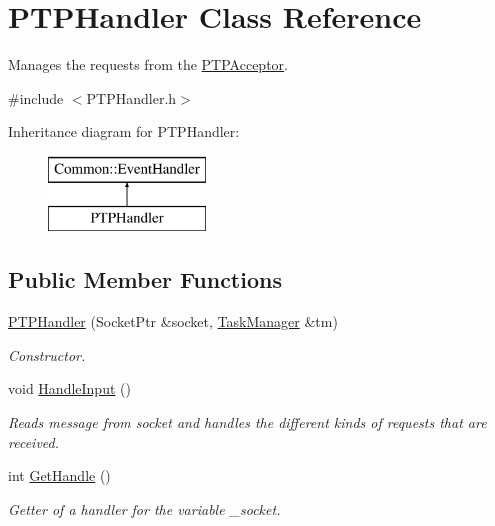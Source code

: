 \hypertarget{class_p_t_p_handler}{\section{P\-T\-P\-Handler Class Reference}
\label{class_p_t_p_handler}
}


Manages the requests from the \hyperlink{class_p_t_p_acceptor}{P\-T\-P\-Acceptor}.  




{\ttfamily \#include $<$P\-T\-P\-Handler.\-h$>$}

Inheritance diagram for P\-T\-P\-Handler\-:\begin{figure}[H]
\begin{center}
\leavevmode
\includegraphics[height=2.000000cm]{class_p_t_p_handler}
\end{center}
\end{figure}
\subsection*{Public Member Functions}
\begin{DoxyCompactItemize}
\item 
\hyperlink{class_p_t_p_handler_a8822999ece7959f308a744a8e2f9820b}{P\-T\-P\-Handler} (Socket\-Ptr \&socket, \hyperlink{class_task_manager}{Task\-Manager} \&tm)
\begin{DoxyCompactList}\small\item\em Constructor. \end{DoxyCompactList}\item 
\hypertarget{class_p_t_p_handler_a7e5a0b3cbf3a55ead9e35d5303d58288}{void \hyperlink{class_p_t_p_handler_a7e5a0b3cbf3a55ead9e35d5303d58288}{Handle\-Input} ()}\label{class_p_t_p_handler_a7e5a0b3cbf3a55ead9e35d5303d58288}

\begin{DoxyCompactList}\small\item\em Reads message from socket and handles the different kinds of requests that are received. \end{DoxyCompactList}\item 
int \hyperlink{class_p_t_p_handler_a88a9be1a38bfc1f434eaac10984dc9a0}{Get\-Handle} ()
\begin{DoxyCompactList}\small\item\em Getter of a handler for the variable \-\_\-socket. \end{DoxyCompactList}\end{DoxyCompactItemize}



